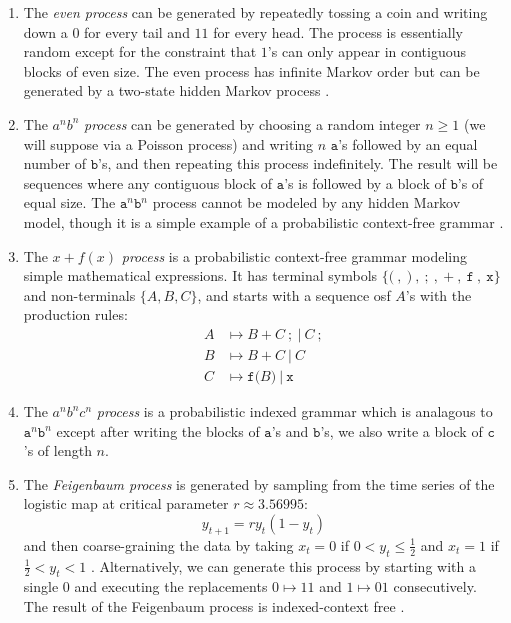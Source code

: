 \documentclass[sigconf, anonymous, review]{acmart}
\begin{document}
\begin{enumerate}
  \item The \emph{even process} can be generated by repeatedly tossing a coin
  and writing down a $0$ for every tail and $11$ for every head. The process is
  essentially random except for the constraint that $1$'s can only appear in
  contiguous blocks of even size. The even process has infinite Markov order but
  can be generated by a two-state hidden Markov process \cite{Crut01a}.
  \item The $a^n b^n$ \emph{process} can be generated by choosing a random
  integer $n\geq 1$ (we will suppose via a Poisson process) and writing $n$
  $\mathtt{a}$'s followed by an equal number of $\mathtt{b}$'s, and then
  repeating this process indefinitely. The result will be sequences where any
  contiguous block of $\mathtt{a}$'s is followed by a block of $\mathtt{b}$'s of
  equal size. The $\mathtt{a}^n \mathtt{b}^n$ process cannot be modeled by any
  hidden Markov model, though it is a simple example of a probabilistic
  context-free grammar \cite{Hopc06a}.
  \item The $x+f(x)$ \emph{process} is a probabilistic context-free grammar
  modeling simple mathematical expressions. It has terminal symbols
  $\{\mathtt{(}\ ,\ \mathtt{)}\ ,\ \mathtt{;}\ ,\ \mathtt{+}\ ,\ \mathtt{f}\ ,\
  \mathtt{x}\}$ and non-terminals $\{A,B,C\}$, and starts with a sequence osf
  $A$'s with the production rules:
  \begin{align*}
    A &\mapsto B\ \mathtt{+}\ C\ \mathtt{;}\ |\ C\ \mathtt{;}\\
    B &\mapsto B\ \mathtt{+}\ C\ |\ C\\
    C &\mapsto \mathtt{f(}B\mathtt{)}\ |\ \mathtt{x}
  \end{align*}
  \item The $a^n b^n c^n$ \emph{process} is a probabilistic indexed grammar
  \cite{Hopc06a} which is analagous to $\mathtt{a}^n \mathtt{b}^n$ except after
  writing the blocks of $\mathtt{a}$'s and $\mathtt{b}$'s, we also write a block
  of $\mathtt{c}$'s of length $n$.
  \item The \emph{Feigenbaum process} is generated by sampling from the time
  series of the logistic map at critical parameter $r\approx 3.56995$:
  \begin{equation*}
    y_{t+1} = r y_t(1-y_t)
  \end{equation*}
  and then coarse-graining the data by taking $x_t = 0$ if $0< y_t \leq
  \frac{1}{2}$ and $x_t = 1$ if $\frac{1}{2} < y_t <1$ \cite{Kurk03a}.
  Alternatively, we can generate this process by starting with a single $0$ and
  executing the replacements $0\mapsto 11$ and $1 \mapsto 01$ consecutively. The
  result of the Feigenbaum process is indexed-context free \cite{Crut92c}.
\end{enumerate}
\end{document}
